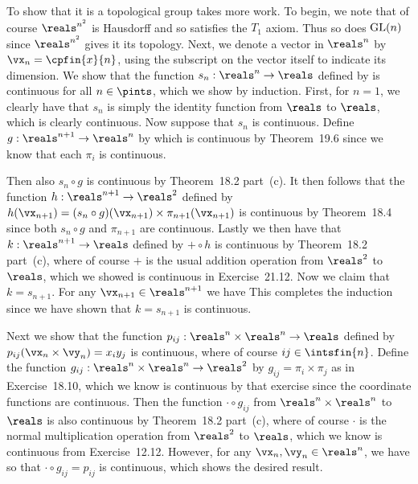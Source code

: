 {{    To show that it is a topological group takes more work.
    To begin, we note that of course $\reals^{n^2}$ is Hausdorff and so satisfies the $T_1$ axiom.
    Thus so does $\mathrm{GL}(n)$ since $\reals^{n^2}$ gives it its topology.
    Next, we denote a vector in $\reals^n$ by $\vx_n = \cpfin{x}{n}$, using the subscript on the vector itself to indicate its dimension.
    We show that the function $s_n: \reals^n \to \reals$ defined by
    is continuous for all $n \in \pints$, which we show by induction.
    First, for $n = 1$, we clearly have that $s_n$ is simply the identity function from $\reals$ to $\reals$, which is clearly continuous.
    Now suppose that $s_n$ is continuous.
    Define $g : \reals^{n+1} \to \reals^n$ by
    which is continuous by Theorem~19.6 since we know that each $\pi_i$ is continuous.

    Then also $s_n \circ g$ is continuous by Theorem~18.2 part~(c).
    It then follows that the function $h : \reals^{n+1} \to \reals^2$ defined by $h(\vx_{n+1}) = (s_n \circ g)(\vx_{n+1}) \times \pi_{n+1}(\vx_{n+1})$ is continuous by Theorem~18.4 since both $s_n \circ g$ and $\pi_{n+1}$ are continuous.
    Lastly we then have that $k : \reals^{n+1} \to \reals$ defined by $+ \circ h$ is continuous by Theorem~18.2 part~(c), where of course $+$ is the usual addition operation from $\reals^2$ to $\reals$, which we showed is continuous in Exercise~21.12.
    Now we claim that $k = s_{n+1}$.
    For any $\vx_{n+1} \in \reals^{n+1}$ we have
    This completes the induction since we have shown that $k = s_{n+1}$ is continuous.

    Next we show that the function $p_{ij} : \reals^n \times \reals^n \to \reals$ defined by $p_{ij}(\vx_n \times \vy_n) = x_i y_j$ is continuous, where of course $ij \in \intsfin{n}$.
    Define the function $g_{ij}: \reals^n \times \reals^n \to \reals^2$ by $g_{ij} = \pi_i \times \pi_j$ as in Exercise~18.10, which we know is continuous by that exercise since the coordinate functions are continuous.
    Then the function $\cdot \circ g_{ij}$ from $\reals^n \times \reals^n$ to $\reals$ is also continuous by Theorem~18.2 part~(c), where of course $\cdot$ is the normal multiplication operation from $\reals^2$ to $\reals$, which we know is continuous from Exercise~12.12.
    However, for any $\vx_n,\vy_n \in \reals^n$, we have
    so that $\cdot \circ g_{ij} = p_{ij}$ is continuous, which shows the desired result.

}}
